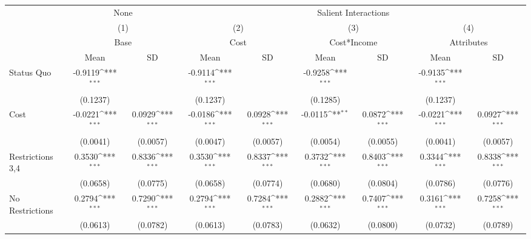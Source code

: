 {
\def\sym#1{\ifmmode^{#1}\else\(^{#1}\)\fi}
\begin{tabular}{l*{8}{c}}
\hline\hline
                &\multicolumn{2}{c}{None}             &\multicolumn{6}{c}{Salient Interactions}                                                                         \\\cmidrule(lr){2-3}\cmidrule(lr){4-9}
                &\multicolumn{2}{c}{(1)}              &\multicolumn{2}{c}{(2)}              &\multicolumn{2}{c}{(3)}              &\multicolumn{2}{c}{(4)}              \\
                &\multicolumn{2}{c}{Base}             &\multicolumn{2}{c}{Cost}             &\multicolumn{2}{c}{Cost*Income}      &\multicolumn{2}{c}{Attributes}       \\
                &     Mean         &       SD         &     Mean         &       SD         &     Mean         &       SD         &     Mean         &       SD         \\
\hline
Status Quo      &  -0.9119\sym{***}&                  &  -0.9114\sym{***}&                  &  -0.9258\sym{***}&                  &  -0.9135\sym{***}&                  \\
                & (0.1237)         &                  & (0.1237)         &                  & (0.1285)         &                  & (0.1237)         &                  \\
Cost            &  -0.0221\sym{***}&   0.0929\sym{***}&  -0.0186\sym{***}&   0.0928\sym{***}&  -0.0115\sym{**} &   0.0872\sym{***}&  -0.0221\sym{***}&   0.0927\sym{***}\\
                & (0.0041)         & (0.0057)         & (0.0047)         & (0.0057)         & (0.0054)         & (0.0055)         & (0.0041)         & (0.0057)         \\
Restrictions 3,4&   0.3530\sym{***}&   0.8336\sym{***}&   0.3530\sym{***}&   0.8337\sym{***}&   0.3732\sym{***}&   0.8403\sym{***}&   0.3344\sym{***}&   0.8338\sym{***}\\
                & (0.0658)         & (0.0775)         & (0.0658)         & (0.0774)         & (0.0680)         & (0.0804)         & (0.0786)         & (0.0776)         \\
No Restrictions &   0.2794\sym{***}&   0.7290\sym{***}&   0.2794\sym{***}&   0.7284\sym{***}&   0.2882\sym{***}&   0.7407\sym{***}&   0.3161\sym{***}&   0.7258\sym{***}\\
                & (0.0613)         & (0.0782)         & (0.0613)         & (0.0783)         & (0.0632)         & (0.0800)         & (0.0732)         & (0.0789)         \\

\end{tabular}}
